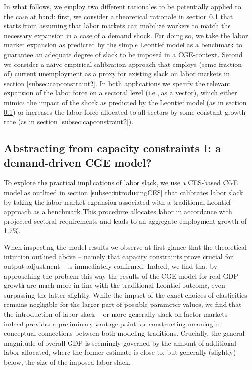 \documentclass{article}
\begin{document}
In what follows, we employ two different rationales to be potentially applied to the case at hand: first, we consider a theoretical rationale in section \ref{subsec:capconstraint1} that starts from assuming that labor markets can mobilize workers to match the necessary expansion in a case of a demand shock. For doing so, we take the labor market expansion as predicted by the simple Leontief model as a benchmark to guarantee an adequate degree of slack to be imposed in a CGE-context. Second we consider a naive empirical calibration approach that employs (some fraction of) current unemployment as a proxy for existing slack on labor markets in section \ref{subsec:capconstraint2}. In both applications we specify the relevant expansion of the labor force on a sectoral level (i.e., as a vector), which either mimics the impact of the shock as predicted by the Leontief model (as in section \ref{subsec:capconstraint1}) or increases the labor force allocated to all sectors by some constant growth rate (as in section \ref{subsec:capconstraint2}).

\subsection{Abstracting from capacity constraints I: a demand-driven CGE model?} \label{subsec:capconstraint1}

To explore the practical implications of labor slack, we use a CES-based CGE model as outlined in section \ref{subsec:introducingCES} that calibrates labor slack by taking the labor market expansion associated with a traditional Leontief approach as a benchmark This procedure allocates labor in accordance with projected sectoral requirements and leads to an aggregate employment growth of 1.7\%. 

When inspecting the model results we observe at first glance that the theoretical intuition outlined above -- namely that capacity constraints prove crucial for output adjustment -- is immediately confirmed. Indeed, we find that by approaching the problem this way the results of the CGE model for real GDP growth are much more in line with the traditional Leontief outcome, even surpassing the latter slightly. While the impact of the exact choices of elasticities remains negligible for the larger part of possible parameter values, we find that the introduction of labor slack -- or more generally slack on factor markets -- indeed provides a preliminary vantage point for constructing meaningful conceptual connections between both modeling traditions. Crucially, the general magnitude of overall GDP is seemingly governed by the amount of additional labor allocated, where the former estimate is close to, but generally (slightly) below, the size of the imposed labor slack.
\end{document}
